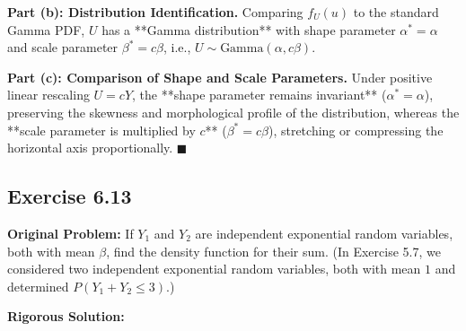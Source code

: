 \documentclass[11pt, letterpaper]{article}
\theoremstyle{definition}
\theoremstyle{remark}
\begin{document}
\textbf{Part (b): Distribution Identification.}
Comparing $f_U(u)$ to the standard Gamma PDF, $U$ has a **Gamma distribution** with shape parameter $\alpha^* = \alpha$ and scale parameter $\beta^* = c\beta$, i.e., $U \sim \text{Gamma}(\alpha, c\beta)$.

\textbf{Part (c): Comparison of Shape and Scale Parameters.}
Under positive linear rescaling $U = cY$, the **shape parameter remains invariant** ($\alpha^* = \alpha$), preserving the skewness and morphological profile of the distribution, whereas the **scale parameter is multiplied by $c$** ($\beta^* = c\beta$), stretching or compressing the horizontal axis proportionally. \hfill $\blacksquare$

\subsection{Exercise 6.13}

\textbf{Original Problem:}
If $Y_1$ and $Y_2$ are independent exponential random variables, both with mean $\beta$, find the density function for their sum. (In Exercise 5.7, we considered two independent exponential random variables, both with mean $1$ and determined $P(Y_1 + Y_2 \le 3)$.)

\hrulefill

\textbf{Rigorous Solution:}
\end{document}
